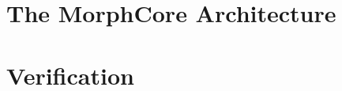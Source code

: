 \documentclass{report}
\begin{document}

\tableofcontents
\newpage

\chapter{The MorphCore Architecture}



\chapter{Verification}


\printindex
\end{document}
